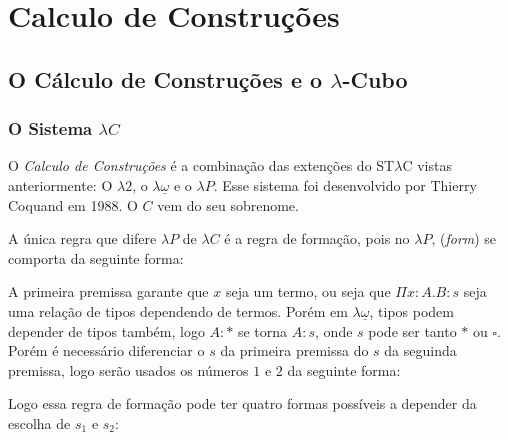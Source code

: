 \documentclass[../main.tex]{subfiles}
\begin{document}
\section{Calculo de Construções}

\subsection{O Cálculo de Construções e o \texorpdfstring{$\lambda$}{L}-Cubo}

\subsubsection{O Sistema \texorpdfstring{$\lambda C$}{LC}}

O \emph{Calculo de Construções} é a combinação das extenções do ST$\lambda$C vistas anteriormente: O $\lambda 2$, o $\lambda \underline{\omega}$ e o $\lambda P$. Esse sistema foi desenvolvido por Thierry Coquand em 1988. O $C$ vem do seu sobrenome.

A única regra que difere $\lambda P$ de $\lambda C$ é a regra de formação, pois no $\lambda P$, (\emph{form}) se comporta da seguinte forma:

\begin{prooftree}
\end{prooftree}

A primeira premissa garante que $x$ seja um termo, ou seja que $\Pi x : A . B : s$ seja uma relação de tipos dependendo de termos. Porém em $\lambda \underline{\omega}$, tipos podem depender de tipos também, logo $A : \ast$ se torna $A : s$, onde $s$ pode ser tanto $\ast$ ou $\square$. Porém é necessário diferenciar o $s$ da primeira premissa do $s$ da seguinda premissa, logo serão usados os números $1$ e $2$ da seguinte forma:

\begin{prooftree}
\end{prooftree}

Logo essa regra de formação pode ter quatro formas possíveis a depender da escolha de $s_1$ e $s_2$:
\end{document}
